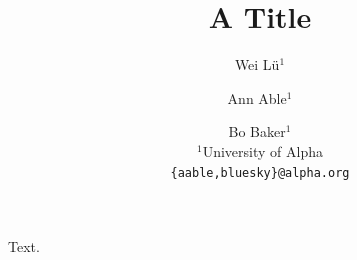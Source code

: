 \documentclass{article}
\title{A Title}
\author{%
  Wei L\"u$^{1}$ \and
  Ann Able$^{1}$ \and
  Bo Baker$^{1}$ \\
 {\normalfont $^1$University of Alpha} \\
 \texttt{\{aable,bluesky\}@alpha.org}
}
\begin{document}
\maketitle
Text.
\end{document}
